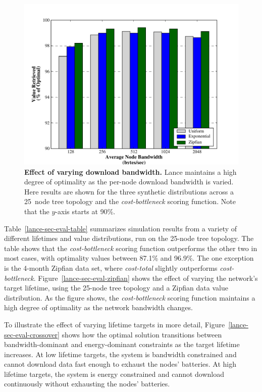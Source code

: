 \begin{figure}[t]
\label{lance-sec-eval-figspeeds}
\begin{center}
\includegraphics[width=1.0\hsize]{./4-lance/figs/gwa/speeds/POLICIES.pdf}
\end{center}
\caption{\textbf{Effect of varying download bandwidth.}
Lance maintains a high degree of optimality as the per-node download
bandwidth is varied.  Here results are shown for the three synthetic
distributions across a 25~node tree topology and the \emph{cost-bottleneck}
scoring function.  Note that the $y$-axis starts at 90\%.}
\end{figure}


Table~\ref{lance-sec-eval-table} summarizes simulation results from a variety
of different lifetimes and value distributions, run on the 25-node tree
topology. The table shows that the {\em cost-bottleneck} scoring function
outperforms the other two in most cases, with optimality values between
87.1\% and 96.9\%.  The one exception is the 4-month Zipfian data set, where
\emph{cost-total} slightly outperforms \emph{cost-bottleneck}.
Figure~\ref{lance-sec-eval-zipfian} shows the effect of varying the network's
target lifetime, using the 25-node tree topology and a Zipfian data value
distribution.  As the figure shows, the \emph{cost-bottleneck} scoring
function maintains a high degree of optimality as the network bandwidth
changes.

To illustrate the effect of varying lifetime targets in more detail,
Figure~\ref{lance-sec-eval-crossover} shows how the optimal solution
transitions between bandwidth-dominant and energy-dominant constraints as the
target lifetime increases. At low lifetime targets, the system is bandwidth
constrained and cannot download data fast enough to exhaust the nodes'
batteries.  At high lifetime targets, the system is energy constrained and
cannot download continuously without exhausting the nodes' batteries.  

